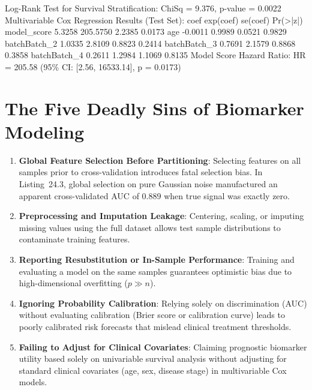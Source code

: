 \documentclass[11pt,twoside,openright]{book}
\begin{document}
\begin{routput}
Log-Rank Test for Survival Stratification: ChiSq = 9.376, p-value = 0.0022
Multivariable Cox Regression Results (Test Set):
                coef exp(coef) se(coef) Pr(>|z|)
model\_score   5.3258  205.5750   2.2385   0.0173
age          -0.0011    0.9989   0.0521   0.9829
batchBatch\_2  1.0335    2.8109   0.8823   0.2414
batchBatch\_3  0.7691    2.1579   0.8868   0.3858
batchBatch\_4  0.2611    1.2984   1.1069   0.8135
Model Score Hazard Ratio: HR = 205.58 (95\% CI: [2.56, 16533.14], p = 0.0173)
\end{routput}

\section{The Five Deadly Sins of Biomarker Modeling}

\begin{enumerate}
    \item \textbf{Global Feature Selection Before Partitioning}: Selecting features on all samples prior to cross-validation introduces fatal selection bias. In Listing~24.3, global selection on pure Gaussian noise manufactured an apparent cross-validated AUC of $0.889$ when true signal was exactly zero.
    \item \textbf{Preprocessing and Imputation Leakage}: Centering, scaling, or imputing missing values using the full dataset allows test sample distributions to contaminate training features.
    \item \textbf{Reporting Resubstitution or In-Sample Performance}: Training and evaluating a model on the same samples guarantees optimistic bias due to high-dimensional overfitting ($p \gg n$).
    \item \textbf{Ignoring Probability Calibration}: Relying solely on discrimination (AUC) without evaluating calibration (Brier score or calibration curve) leads to poorly calibrated risk forecasts that mislead clinical treatment thresholds.
    \item \textbf{Failing to Adjust for Clinical Covariates}: Claiming prognostic biomarker utility based solely on univariable survival analysis without adjusting for standard clinical covariates (age, sex, disease stage) in multivariable Cox models.
\end{enumerate}
\end{document}
